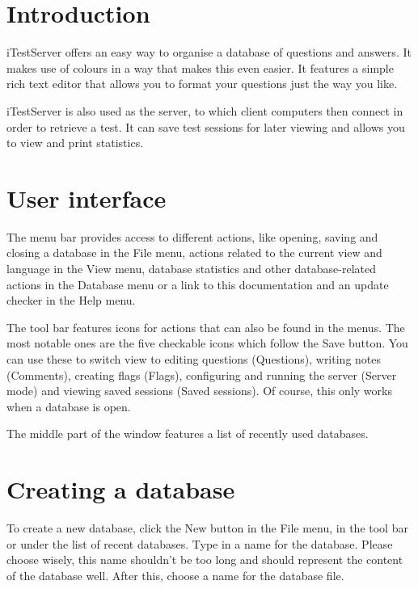 \section{Introduction}

iTestServer offers an easy way to organise a database of questions and answers.
It makes use of colours in a way that makes this even easier.
It features a simple rich text editor that allows you to format your questions just the way you like.

iTestServer is also used as the server, to which client computers then connect in order to retrieve a test.
It can save test sessions for later viewing and allows you to view and print statistics.

\section{User interface}


The menu bar provides access to different actions, like opening, saving and closing a database in the File menu, actions related to the current view and language in the View menu, database statistics and other database-related actions in the Database menu or a link to this documentation and an update checker in the Help menu.

The tool bar features icons for actions that can also be found in the menus.
The most notable ones are the five checkable icons which follow the Save button.
You can use these to switch view to editing questions (Questions), writing notes (Comments), creating flags (Flags), configuring and running the server (Server mode) and viewing saved sessions (Saved sessions).
Of course, this only works when a database is open.


The middle part of the window features a list of recently used databases.


\section{Creating a database}

To create a new database, click the New button in the File menu, in the tool bar or under the list of recent databases.
Type in a name for the database.
Please choose wisely, this name shouldn't be too long and should represent the content of the database well.
After this, choose a name for the database file.

